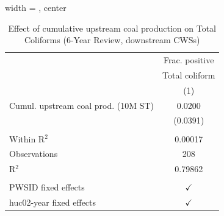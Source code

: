 
\begin{table}[htbp]
   
   \caption{\label{tab:6yr_huc02fe_tc} Effect of cumulative upstream coal production on Total Coliforms (6-Year Review, downstream CWSs)}
   \bigskip
   
   \centering
   
   \begin{adjustbox}{width = \textwidth, center}
      
      
      \begin{tabular}{lc}
         \toprule
         
                                             & Frac. positive\\  
         
                                             & Total coliform \\   
         
                                             & (1)\\  
         
         \midrule 
         Cumul. upstream coal prod. (10M ST) & 0.0200\\   
                                             & (0.0391)\\   
         
          \\
         
         Within R$^2$                        & 0.00017\\  
         Observations                        & 208\\  
         R$^2$                               & 0.79862\\  
         
          \\
         
         PWSID fixed effects                 & $\checkmark$\\   
         huc02-year fixed effects            & $\checkmark$\\   
         
         \bottomrule
         
      \end{tabular}
      
      

\end{adjustbox}
\end{table}
